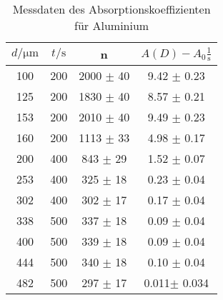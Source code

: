 \begin{table}
    \center
    \begin{tabular}{c c c c}
        \toprule
        $d / \unit{\micro\meter}$ &  $t / \unit\second$ &     n & $A(D) - A_0 \frac{1}{\unit\second}$\\
        \midrule
                100 &    200 &   2000  $\pm$  40 &   9.42 $\pm$ 0.23 \\
                125 &    200 &   1830  $\pm$  40 &   8.57 $\pm$ 0.21 \\
                153 &    200 &   2010  $\pm$  40 &   9.49 $\pm$ 0.23 \\
                160 &    200 & 1113 $\pm$ 33 &   4.98 $\pm$ 0.17 \\
                200 &    400 &  843 $\pm$ 29 &   1.52 $\pm$ 0.07 \\
                253 &    400 &  325 $\pm$ 18 &   0.23 $\pm$ 0.04 \\
                302 &    400 &  302 $\pm$ 17 &   0.17 $\pm$ 0.04 \\
                338 &    500 &  337 $\pm$ 18 &   0.09 $\pm$ 0.04 \\
                400 &    500 &  339 $\pm$ 18 &   0.09 $\pm$ 0.04 \\
                444 &    500 &  340 $\pm$ 18 &   0.10 $\pm$ 0.04 \\
                482 &    500 &  297 $\pm$ 17 &   0.011$\pm$ 0.034\\
        \bottomrule
    \end{tabular}
    \caption{Messdaten des Absorptionskoeffizienten für Aluminium}
    \label{tab:md3alu}
\end{table}